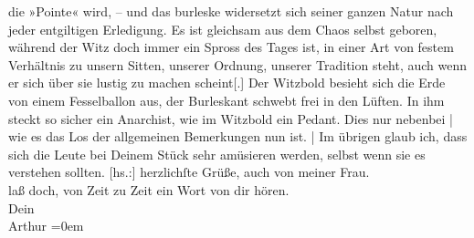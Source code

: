 \begin{ledgroupsized}[t]{13cm}
               die »Pointe« wird, \introOben{}–\introOben{} und das burleske widersetzt sich seiner
               ganzen Natur nach jeder entgiltigen Erledigung. Es ist gleichsam aus dem Chaos selbst
               geboren, während der Witz doch immer ein Spross des Tages ist, in einer Art von
               festem Verhältnis zu unsern Sitten, unserer Ordnung, unserer Tradition steht, auch
               wenn er sich über sie lustig zu machen scheint{[}.{]} Der Witz\introOben{}bold\introOben{} besieht sich die Erde von einem Fesselballon aus, der
               Burleskant schwebt frei in den Lüften. In ihm steckt so sicher ein Anarchist, wie im
               Witzbold ein Pedant. Dies nur nebenbei | wie es das Los der allgemeinen Bemerkungen
               nun ist. | Im übrigen glaub ich, dass sich die Leute bei Deinem Stück sehr amüsieren
               werden, selbst wenn sie es verstehen sollten.\pend
           \pstart
           {[}hs.:{]} herzlichſte Grüße, auch von meiner Frau.{\\[\baselineskip]}laß doch, von Zeit zu Zeit ein Wort von dir hören.{\\[\baselineskip]}Dein{\\[\baselineskip]}\spacefill\mbox{Arthur}\pend
           \leftskip=0em{}\endnumbering{}\end{ledgroupsized}  \newcommand{\dateiname}{L01721}\newcommand{\titel}{Arthur Schnitzler an Hermann Bahr, 11. 10. 1907}\newcommand{\editorInnen}{ Kurt Ifkovits,  Martin Anton Müller}
            \footnotesize
\begin{ledgroupsized}[t]{11.5cm}
\end{ledgroupsized}
         
      
